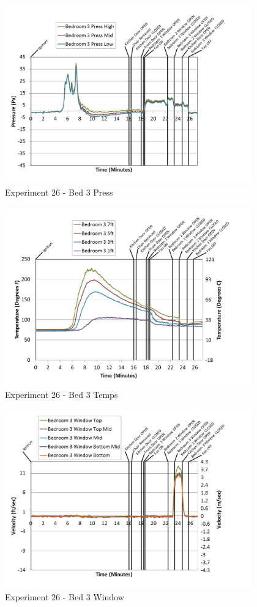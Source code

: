 \documentclass{article}
\begin{document}
\begin{appendices}
\clearpage

\begin{figure}[h!]
	\centering
	\includegraphics[height=3.05in]{0_Images/Results_Charts/Exp_26_Charts/Bed3Press.png}
	\caption{Experiment 26 - Bed 3 Press}
\end{figure}


\begin{figure}[h!]
	\centering
	\includegraphics[height=3.05in]{0_Images/Results_Charts/Exp_26_Charts/Bed3Temps.png}
	\caption{Experiment 26 - Bed 3 Temps}
\end{figure}

\clearpage

\begin{figure}[h!]
	\centering
	\includegraphics[height=3.05in]{0_Images/Results_Charts/Exp_26_Charts/Bed3Window.png}
	\caption{Experiment 26 - Bed 3 Window}
\end{figure}



\end{appendices}
\end{document}

